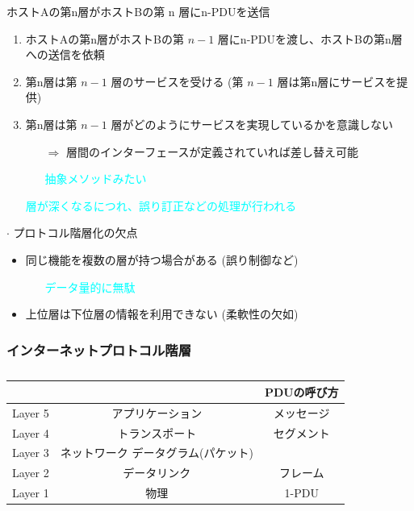 ホストAの第n層がホストBの第 n 層にn-PDUを送信
\begin{enumerate}
  \item ホストAの第n層がホストBの第 $n-1$ 層にn-PDUを渡し、ホストBの第n層への送信を依頼
  \item 第n層は第 $n-1$ 層のサービスを受ける  (第 $n-1$ 層は第n層にサービスを提供)
  \item 第n層は第 $n-1$ 層がどのようにサービスを実現しているかを意識しない
  \begin{itemize}
    \item[$\Rightarrow$] 層間のインターフェースが定義されていれば差し替え可能
    \item[] \textcolor{cyan}{抽象メソッドみたい}
  \end{itemize}
  \item[] \textcolor{cyan}{層が深くなるにつれ、誤り訂正などの処理が行われる}
\end{enumerate}


$\cdot$ プロトコル階層化の欠点
\begin{itemize}
  \item 同じ機能を複数の層が持つ場合がある (誤り制御など)
  \begin{itemize}
    \item[] \textcolor{cyan}{データ量的に無駄}
  \end{itemize}
  \item 上位層は下位層の情報を利用できない (柔軟性の欠如)
\end{itemize}


\newpage
\subsubsection{インターネットプロトコル階層}

\begin{table}[h]
  \centering
  \caption{}
  \label{tab:}
  \begin{tabular}{c|c|c}
    && PDUの呼び方\\\hline
    Layer 5 & アプリケーション & メッセージ \\
    Layer 4 & トランスポート & セグメント\\
    Layer 3 & ネットワーク データグラム(パケット)\\
    Layer 2 & データリンク & フレーム\\
    Layer 1 & 物理 & 1-PDU\\\hline
  \end{tabular}
\end{table}

